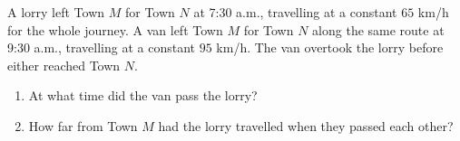 A lorry left Town $M$ for Town $N$ at 7:30 a.m., travelling at a constant $65$ km/h for the whole journey. A van left Town $M$ for Town $N$ along the same route at 9:30 a.m., travelling at a constant $95$ km/h. The van overtook the lorry before either reached Town $N$.
\begin{enumerate}
\item[(a)] At what time did the van pass the lorry?
\item[(b)] How far from Town $M$ had the lorry travelled when they passed each other?
\end{enumerate}
